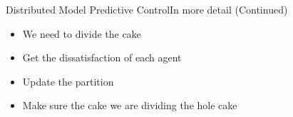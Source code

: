 \documentclass[aspectratio=169]{beamer}
\newcommand{\tikzmark}[1]{\tikz[baseline={(#1.base)},overlay,remember picture] \node[outer sep=0pt, inner sep=0pt] (#1) {\phantom{A}};}
\begin{document}
\begin{frame}{Distributed Model Predictive Control}{In more detail (Continued)}
  \begin{overlayarea}{\textwidth}{.5\textwidth}
    \begin{itemize}[<+(1)->]
      \item We need to divide the cake
      \item Get the dissatisfaction of each agent
      \item Update the partition
      \item Make sure the cake we are dividing the hole cake
    \end{itemize}

    \vspace{1cm}

\end{overlayarea}
\end{frame}
\end{document}
